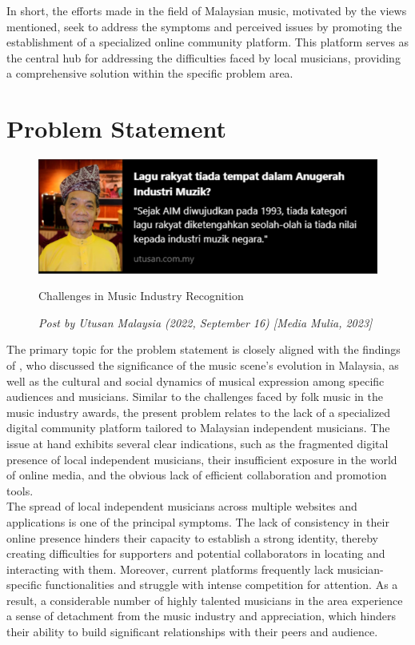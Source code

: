 In short, the efforts made in the field of Malaysian music, motivated by the views mentioned, seek to address the symptoms and perceived issues by promoting the establishment of a specialized online community platform. This platform serves as the central hub for addressing the difficulties faced by local musicians, providing a comprehensive solution within the specific problem area.

\section{Problem Statement}
\begin{figure}[h]
    \centering
    \includegraphics[width=0.6\linewidth]{mainmatter/images/probstate1.png}
    \caption{Challenges in Music Industry Recognition}
    \caption*{\textit{Post by Utusan Malaysia (2022, September 16) [Media Mulia, 2023]}}
    \label{fig:myfig1}
\end{figure}
The primary topic for the problem statement is closely aligned with the findings of \textcite{silahudin19}, who discussed the significance of the music scene's evolution in Malaysia, as well as the cultural and social dynamics of musical expression among specific audiences and musicians. Similar to the challenges faced by folk music in the music industry awards, the present problem relates to the lack of a specialized digital community platform tailored to Malaysian independent musicians. The issue at hand exhibits several clear indications, such as the fragmented digital presence of local independent musicians, their insufficient exposure in the world of online media, and the obvious lack of efficient collaboration and promotion tools. \\

The spread of local independent musicians across multiple websites and applications is one of the principal symptoms. The lack of consistency in their online presence hinders their capacity to establish a strong identity, thereby creating difficulties for supporters and potential collaborators in locating and interacting with them. Moreover, current platforms frequently lack musician-specific functionalities and struggle with intense competition for attention. As a result, a considerable number of highly talented musicians in the area experience a sense of detachment from the music industry and appreciation, which hinders their ability to build significant relationships with their peers and audience. \\

